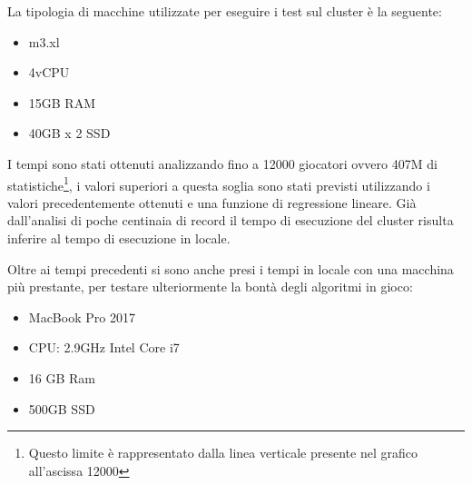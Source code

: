 \documentclass[10pt,a4paper,twocolumn]{article}
\begin{document}
La tipologia di macchine utilizzate per eseguire i test sul cluster è la seguente:
\begin{itemize}
	\item m3.xl
	\item 4vCPU
	\item 15GB RAM
	\item 40GB x 2 SSD
\end{itemize}


I tempi sono stati ottenuti analizzando fino a 12000 giocatori ovvero 407M di statistiche\footnote{Questo limite è rappresentato dalla linea verticale presente nel grafico all'ascissa 12000}, i valori superiori a questa soglia sono stati previsti utilizzando i valori precedentemente ottenuti e una funzione di regressione lineare. Già dall'analisi di poche centinaia di record il tempo di esecuzione del cluster risulta inferire al tempo di esecuzione in locale.

Oltre ai tempi precedenti si sono anche presi i tempi in locale con una macchina più prestante, per testare ulteriormente la bontà degli algoritmi in gioco: 
\begin{itemize}
	\item MacBook Pro 2017
	\item CPU: 2.9GHz Intel Core i7
	\item 16 GB Ram
	\item 500GB SSD
\end{itemize}
\end{document}
